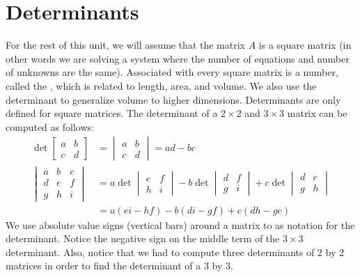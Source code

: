 \section{Determinants}
For the rest of this unit, we will assume that the matrix $A$ is a square matrix (in other words we are solving a system where the number of equations and number of unknowns are the same).
Associated with every square matrix is a number, called the , which is related to length, area, and volume.  We also use the determinant to generalize volume to higher dimensions. Determinants are only defined for square matrices.
The determinant of a {$2\times 2$} and {$3\times 3$} matrix can be computed as follows: 
\begin{align*}
\det\begin{bmatrix}a&b\\c&d\end{bmatrix} &=\begin{vmatrix}a&b\\c&d\end{vmatrix} = ad-bc\\
\begin{vmatrix}a&b&c\\d&e&f\\g&h&i\end{vmatrix} &= a\det\begin{vmatrix}e&f\\h&i\end{vmatrix} -b\det\begin{vmatrix}d&f\\g&i\end{vmatrix} +c\det\begin{vmatrix}d&e\\g&h\end{vmatrix}\\
&=a(ei-hf)-b(di-gf)+c(dh-ge)
\end{align*}
We use absolute value signs (vertical bars) around a matrix to as notation for the determinant. Notice the negative sign on the middle term of the {$3 \times 3$} determinant. Also, notice that we had to compute three determinants of 2 by 2 matrices in order to find the determinant of a 3 by 3.  

